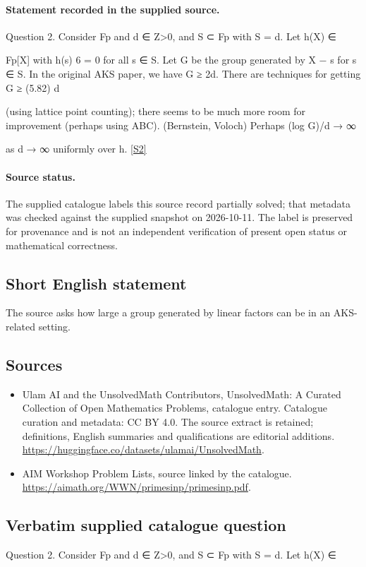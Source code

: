 \documentclass[11pt]{article}
\begin{document}
\paragraph{Statement recorded in the supplied source.}
Question 2. Consider Fp and d ∈ Z>0, and S ⊂ Fp with S = d. Let h(X) ∈

Fp[X] with h(s) 6 = 0 for all s ∈ S. Let G be the group generated by X − s for s ∈ S. In the original AKS paper, we have G ≥ 2d. There are techniques for getting G ≥ (5.82) d

(using lattice point counting); there seems to be much more room for improvement (perhaps using ABC). (Bernstein, Voloch) Perhaps (log G)/d → ∞

as d → ∞ uniformly over h. \href{https://aimath.org/WWN/primesinp/primesinp.pdf}{[S2]}
\paragraph{Source status.}
The supplied catalogue labels this source record partially solved; that metadata was checked against the supplied snapshot on 2026-10-11. The label is preserved for provenance and is not an independent verification of present open status or mathematical correctness.
\subsection{Short English statement}
The source asks how large a group generated by linear factors can be in an AKS-related setting.
\subsection{Sources}
\begin{itemize}
\item[S1] Ulam AI and the UnsolvedMath Contributors, UnsolvedMath: A Curated Collection of Open Mathematics Problems, catalogue entry. Catalogue curation and metadata: CC BY 4.0. The source extract is retained; definitions, English summaries and qualifications are editorial additions.
\url{https://huggingface.co/datasets/ulamai/UnsolvedMath}.
\item[S2] AIM Workshop Problem Lists, source linked by the catalogue.
\url{https://aimath.org/WWN/primesinp/primesinp.pdf}.
\end{itemize}
\subsection{Verbatim supplied catalogue question}
Question 2. Consider Fp and d ∈ Z>0, and S ⊂ Fp with S = d. Let h(X) ∈
\end{document}
